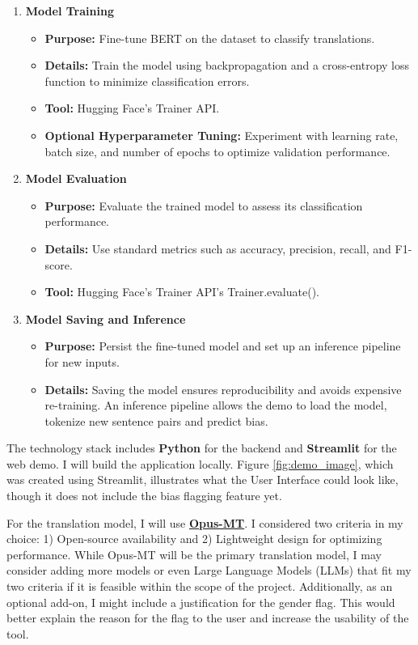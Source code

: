 \begin{description}
\begin{enumerate}
    \item \textbf{Model Training}
    \begin{itemize}
        \item \textbf{Purpose:} Fine-tune BERT on the dataset to classify translations.
        \item \textbf{Details:} Train the model using backpropagation and a cross-entropy loss function to minimize classification errors.
        \item \textbf{Tool:} Hugging Face's Trainer API.
        \item \textbf{Optional Hyperparameter Tuning:} Experiment with learning rate, batch size, and number of epochs to optimize validation performance.
    \end{itemize}

    \item \textbf{Model Evaluation}
    \begin{itemize}
        \item \textbf{Purpose:} Evaluate the trained model to assess its classification performance.
        \item \textbf{Details:} Use standard metrics such as accuracy, precision, recall, and F1-score.
        \item \textbf{Tool:} Hugging Face's Trainer API's Trainer.evaluate().
    \end{itemize}
    
    \item \textbf{Model Saving and Inference}
    \begin{itemize}
        \item \textbf{Purpose:} Persist the fine-tuned model and set up an inference pipeline for new inputs.
        \item \textbf{Details:}  
        Saving the model ensures reproducibility and avoids expensive re-training.  
        An inference pipeline allows the demo to load the model, tokenize new sentence pairs and predict bias.
    \end{itemize}
\end{enumerate}


The technology stack includes \textbf{Python} for the backend and \textbf{Streamlit} for the web demo. I will build the application locally. Figure \ref{fig:demo_image}, which was created using Streamlit, illustrates what the User Interface could look like, though it does not include the bias flagging feature yet.


For the translation model, I will use \textbf{\href{https://github.com/Helsinki-NLP/Opus-MT?tab=readme-ov-file}{Opus-MT}}. I considered two criteria in my choice: 1) Open-source availability and 2) Lightweight design for optimizing performance. While Opus-MT will be the primary translation model, I may consider adding more models or even Large Language Models (LLMs) that fit my two criteria if it is feasible within the scope of the project. Additionally, as an optional add-on, I might include a justification for the gender flag. This would better explain the reason for the flag to the user and increase the usability of the tool.


\end{description}
